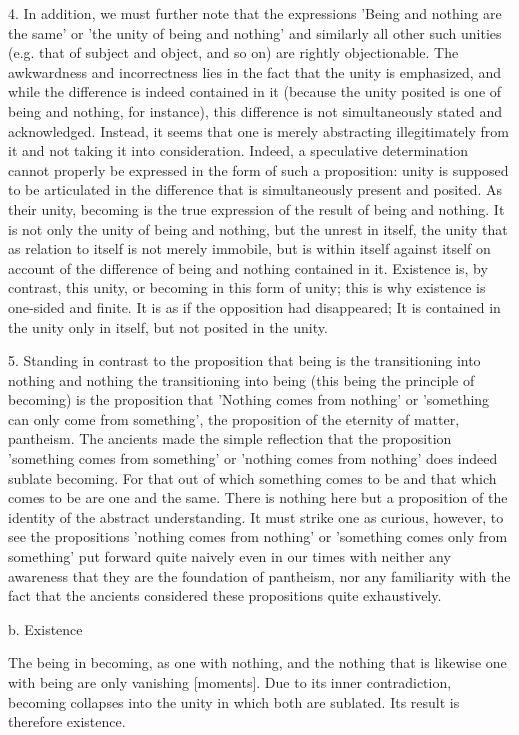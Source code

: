 4. In addition, we must further note that the expressions
'Being and nothing are the same' or
'the unity of being and nothing' and
similarly all other such unities
(e.g. that of subject and object, and so on)
are rightly objectionable.
The awkwardness and incorrectness lies in the fact that
the unity is emphasized, and while the difference is indeed contained in it
(because the unity posited is one of being and nothing, for instance),
this difference is not simultaneously stated and acknowledged.
Instead, it seems that one is merely abstracting illegitimately
from it and not taking it into consideration.
Indeed, a speculative determination cannot properly be
expressed in the form of such a proposition:
unity is supposed to be articulated in the difference
that is simultaneously present and posited.
As their unity, becoming is the true expression of
the result of being and nothing.
It is not only the unity of being and nothing,
but the unrest in itself,
the unity that as relation to itself is
not merely immobile,
but is within itself against itself
on account of the difference of
being and nothing contained in it.
Existence is, by contrast, this unity, or
becoming in this form of unity;
this is why existence is one-sided and finite.
It is as if the opposition had disappeared;
It is contained in the unity only in itself,
but not posited in the unity.

5. Standing in contrast to the proposition
that being is the transitioning into nothing and
nothing the transitioning into being
(this being the principle of becoming)
is the proposition that 'Nothing comes from nothing'
or 'something can only come from something',
the proposition of the eternity of matter, pantheism.
The ancients made the simple reflection that the proposition
'something comes from something' or
'nothing comes from nothing'
does indeed sublate becoming.
For that out of which something comes to be and
that which comes to be are one and the same.
There is nothing here but a proposition of
the identity of the abstract understanding.
It must strike one as curious, however, to see the propositions
'nothing comes from nothing' or 'something comes only from something'
put forward quite naively even in our times
with neither any awareness that they are the foundation of pantheism,
nor any familiarity with the fact that the ancients
considered these propositions quite exhaustively.

b. Existence

The being in becoming,
as one with nothing,
and the nothing that is
likewise one with being
are only vanishing [moments].
Due to its inner contradiction,
becoming collapses into the unity
in which both are sublated.
Its result is therefore existence.

